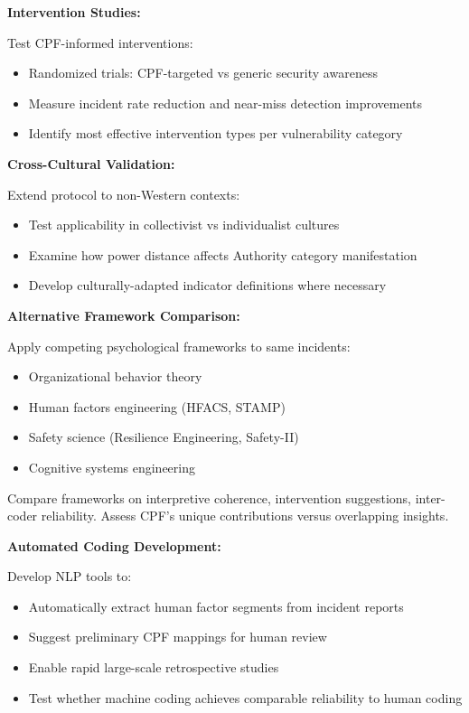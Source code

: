 \documentclass[11pt,a4paper]{article}
\begin{document}
\textbf{Intervention Studies:}

Test CPF-informed interventions:
\begin{itemize}
\item Randomized trials: CPF-targeted vs generic security awareness
\item Measure incident rate reduction and near-miss detection improvements
\item Identify most effective intervention types per vulnerability category
\end{itemize}

\textbf{Cross-Cultural Validation:}

Extend protocol to non-Western contexts:
\begin{itemize}
\item Test applicability in collectivist vs individualist cultures
\item Examine how power distance affects Authority category manifestation
\item Develop culturally-adapted indicator definitions where necessary
\end{itemize}

\textbf{Alternative Framework Comparison:}

Apply competing psychological frameworks to same incidents:
\begin{itemize}
\item Organizational behavior theory
\item Human factors engineering (HFACS, STAMP)
\item Safety science (Resilience Engineering, Safety-II)
\item Cognitive systems engineering
\end{itemize}

Compare frameworks on interpretive coherence, intervention suggestions, inter-coder reliability. Assess CPF's unique contributions versus overlapping insights.

\textbf{Automated Coding Development:}

Develop NLP tools to:
\begin{itemize}
\item Automatically extract human factor segments from incident reports
\item Suggest preliminary CPF mappings for human review
\item Enable rapid large-scale retrospective studies
\item Test whether machine coding achieves comparable reliability to human coding
\end{itemize}
\end{document}
